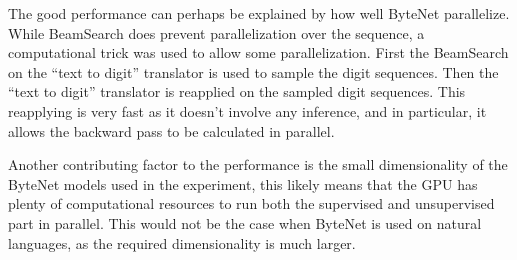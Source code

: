 The good performance can perhaps be explained by how well ByteNet parallelize. While BeamSearch does prevent parallelization over the sequence, a computational trick was used to allow some parallelization. First the BeamSearch on the ``text to digit'' translator is used to sample the digit sequences. Then the ``text to digit'' translator is reapplied on the sampled digit sequences. This reapplying is very fast as it doesn't involve any inference, and in particular, it allows the backward pass to be calculated in parallel.

Another contributing factor to the performance is the small dimensionality of the ByteNet models used in the experiment, this likely means that the GPU has plenty of computational resources to run both the supervised and unsupervised part in parallel. This would not be the case when ByteNet is used on natural languages, as the required dimensionality is much larger.